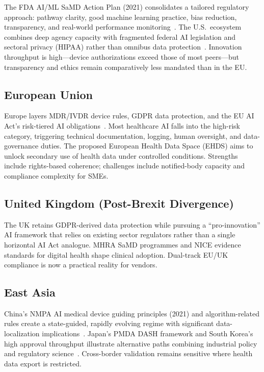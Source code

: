 The FDA AI/ML SaMD Action Plan (2021) consolidates a tailored regulatory approach: pathway clarity, good machine learning practice, bias reduction, transparency, and real-world performance monitoring~\cite{fda2021}. The U.S.\ ecosystem combines deep agency capacity with fragmented federal AI legislation and sectoral privacy (HIPAA) rather than omnibus data protection~\cite{cohen2018}. Innovation throughput is high---device authorizations exceed those of most peers---but transparency and ethics remain comparatively less mandated than in the EU.

\subsection{European Union}

Europe layers MDR/IVDR device rules, GDPR data protection, and the EU AI Act's risk-tiered AI obligations~\cite{euaiact2024}. Most healthcare AI falls into the high-risk category, triggering technical documentation, logging, human oversight, and data-governance duties. The proposed European Health Data Space (EHDS) aims to unlock secondary use of health data under controlled conditions. Strengths include rights-based coherence; challenges include notified-body capacity and compliance complexity for SMEs.

\subsection{United Kingdom (Post-Brexit Divergence)}

The UK retains GDPR-derived data protection while pursuing a ``pro-innovation'' AI framework that relies on existing sector regulators rather than a single horizontal AI Act analogue. MHRA SaMD programmes and NICE evidence standards for digital health shape clinical adoption. Dual-track EU/UK compliance is now a practical reality for vendors.

\subsection{East Asia}

China's NMPA AI medical device guiding principles (2021) and algorithm-related rules create a state-guided, rapidly evolving regime with significant data-localization implications~\cite{nmpa2021}. Japan's PMDA DASH framework and South Korea's high approval throughput illustrate alternative paths combining industrial policy and regulatory science~\cite{pmda2020}. Cross-border validation remains sensitive where health data export is restricted.

